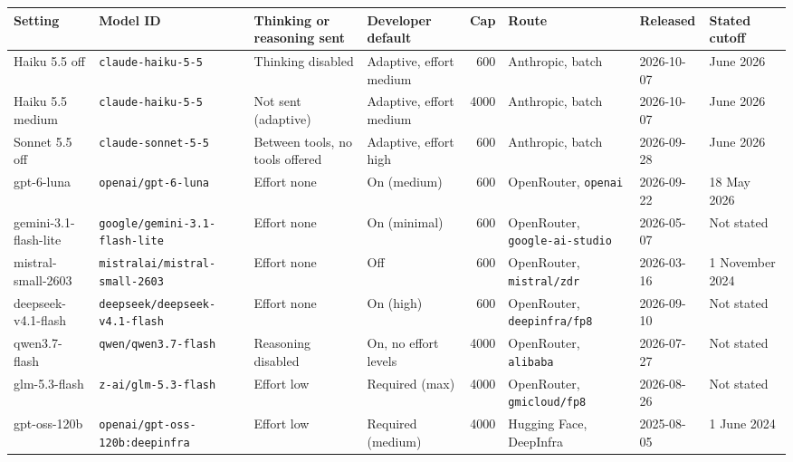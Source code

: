 \begin{table}[t]
\centering
\scriptsize
\setlength{\tabcolsep}{2.5pt}
\begin{adjustbox}{max width=\linewidth}
\begin{tabular}{P{0.10}P{0.21}P{0.13}P{0.12}rP{0.13}P{0.08}P{0.08}}
\toprule
Setting & Model ID & Thinking or reasoning sent & Developer default & Cap & Route & Released & Stated cutoff \\
\midrule
Haiku 5.5 off & \texttt{claude-\allowbreak{}haiku-\allowbreak{}5-\allowbreak{}5} & Thinking disabled & Adaptive, effort medium & 600 & Anthropic, batch & 2026-10-07 & June 2026 \\
Haiku 5.5 medium & \texttt{claude-\allowbreak{}haiku-\allowbreak{}5-\allowbreak{}5} & Not sent (adaptive) & Adaptive, effort medium & 4000 & Anthropic, batch & 2026-10-07 & June 2026 \\
Sonnet 5.5 off & \texttt{claude-\allowbreak{}sonnet-\allowbreak{}5-\allowbreak{}5} & Between tools, no tools offered & Adaptive, effort high & 600 & Anthropic, batch & 2026-09-28 & June 2026 \\
gpt-6-luna & \texttt{openai/\allowbreak{}gpt-\allowbreak{}6-\allowbreak{}luna} & Effort none & On (medium) & 600 & OpenRouter, \texttt{openai} & 2026-09-22 & 18 May 2026 \\
gemini-3.1-flash-lite & \texttt{google/\allowbreak{}gemini-\allowbreak{}3.1-\allowbreak{}flash-\allowbreak{}lite} & Effort none & On (minimal) & 600 & OpenRouter, \texttt{google-ai-studio} & 2026-05-07 & Not stated \\
mistral-small-2603 & \texttt{mistralai/\allowbreak{}mistral-\allowbreak{}small-\allowbreak{}2603} & Effort none & Off & 600 & OpenRouter, \texttt{mistral/zdr} & 2026-03-16 & 1 November 2024 \\
deepseek-v4.1-flash & \texttt{deepseek/\allowbreak{}deepseek-\allowbreak{}v4.1-\allowbreak{}flash} & Effort none & On (high) & 600 & OpenRouter, \texttt{deepinfra/fp8} & 2026-09-10 & Not stated \\
qwen3.7-flash & \texttt{qwen/\allowbreak{}qwen3.7-\allowbreak{}flash} & Reasoning disabled & On, no effort levels & 4000 & OpenRouter, \texttt{alibaba} & 2026-07-27 & Not stated \\
glm-5.3-flash & \texttt{z-\allowbreak{}ai/\allowbreak{}glm-\allowbreak{}5.3-\allowbreak{}flash} & Effort low & Required (max) & 4000 & OpenRouter, \texttt{gmicloud/fp8} & 2026-08-26 & Not stated \\
gpt-oss-120b & \texttt{openai/\allowbreak{}gpt-\allowbreak{}oss-\allowbreak{}120b:\allowbreak{}deepinfra} & Effort low & Required (medium) & 4000 & Hugging Face, DeepInfra & 2025-08-05 & 1 June 2024 \\

\end{tabular}
\end{adjustbox}
\end{table}
